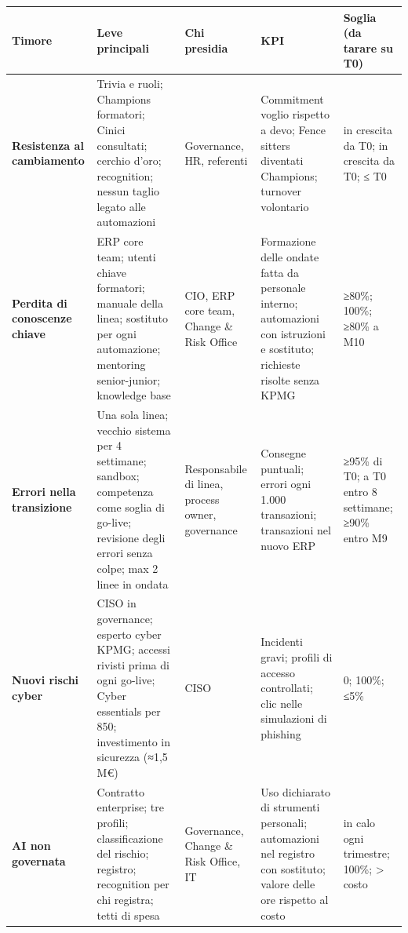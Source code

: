 \documentclass[11pt,a4paper]{article}
\begin{document}
{\small\renewcommand{\arraystretch}{1.25}
\begin{xltabular}{\linewidth}{@{}>{\raggedright\arraybackslash{}\hsize\hspace{0pt}}X>{\raggedright\arraybackslash{}\hsize\hspace{0pt}}X>{\raggedright\arraybackslash{}\hsize\hspace{0pt}}X>{\raggedright\arraybackslash{}\hsize\hspace{0pt}}X>{\raggedright\arraybackslash{}\hsize\hspace{0pt}}X@{}}
\toprule
\textbf{Timore} & \textbf{Leve principali} & \textbf{Chi presidia} & \textbf{KPI} & \textbf{Soglia (da tarare su T0)} \\
\midrule
\endhead
\textbf{Resistenza al cambiamento} & Trivia e ruoli; Champions formatori; Cinici consultati; cerchio d'oro; recognition; nessun taglio legato alle automazioni & Governance, HR, referenti & Commitment \guillemotleft{}voglio\guillemotright{} rispetto a \guillemotleft{}devo\guillemotright{}; Fence sitters diventati Champions; turnover volontario & in crescita da T0; in crescita da T0; ≤ T0 \\
\textbf{Perdita di conoscenze chiave} & ERP core team; utenti chiave formatori; manuale della linea; sostituto per ogni automazione; mentoring senior-junior; knowledge base & CIO, ERP core team, Change \& Risk Office & Formazione delle ondate fatta da personale interno; automazioni con istruzioni e sostituto; richieste risolte senza KPMG & ≥80\%; 100\%; ≥80\% a M10 \\
\textbf{Errori nella transizione} & Una sola linea; vecchio sistema per 4 settimane; sandbox; competenza come soglia di go-live; revisione degli errori senza colpe; max 2 linee in ondata & Responsabile di linea, process owner, governance & Consegne puntuali; errori ogni 1.000 transazioni; transazioni nel nuovo ERP & ≥95\% di T0; a T0 entro 8 settimane; ≥90\% entro M9 \\
\textbf{Nuovi rischi cyber} & CISO in governance; esperto cyber KPMG; accessi rivisti prima di ogni go-live; Cyber essentials per 850; investimento in sicurezza (≈1,5 M€) & CISO & Incidenti gravi; profili di accesso controllati; clic nelle simulazioni di phishing & 0; 100\%; ≤5\% \\
\textbf{AI non governata} & Contratto enterprise; tre profili; classificazione del rischio; registro; recognition per chi registra; tetti di spesa & Governance, Change \& Risk Office, IT & Uso dichiarato di strumenti personali; automazioni nel registro con sostituto; valore delle ore rispetto al costo & in calo ogni trimestre; 100\%; > costo \\
\bottomrule
\end{xltabular}}
\end{document}
